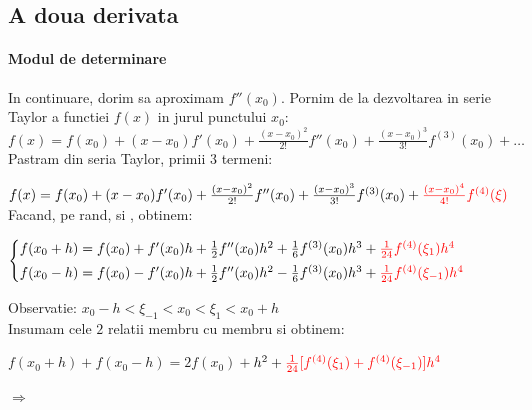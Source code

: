 \documentclass{article}
\begin{document}
\subsection{A doua derivata}
\label{sec:sec_der}

\paragraph{Modul de determinare}

\tabto{0.5cm} In continuare, dorim sa aproximam $f''(x_0)$. Pornim de la dezvoltarea in serie Taylor\framebox[0.3cm][r]{\footnotemark} a functiei $f(x)$ in jurul punctului $x_0$:
$f(x) = f(x_0) + (x-x_0)f'(x_0) + \frac{(x-x_0)^2}{2!}f''(x_0) + \frac{(x-x_0)^3}{3!}f^{(3)}(x_0) + \dots$\\

Pastram din seria Taylor, primii $3$ termeni:

$f(x) = f(x_0) + (x-x_0)f'(x_0) + \frac{(x-x_0)^2}{2!}f''(x_0) + \frac{(x-x_0)^3}{3!}f^{(3)}(x_0) + \textcolor{red}{\frac{(x-x_0)^4}{4!}f^{(4)}(\xi)}$\\

Facand, pe rand,  si , obtinem:

\vspace{0.1cm}$\begin{cases}
    f(x_0+h) = f(x_0) + f'(x_0) h + \frac{1}{2} f''(x_0) h^2 + \frac{1}{6} f^{(3)}(x_0) h^3 + \textcolor{red}{\frac{1}{24} f^{(4)}(\xi_1) h^4} \vspace{0.1cm}\\
    f(x_0-h) = f(x_0) - f'(x_0) h + \frac{1}{2} f''(x_0) h^2 - \frac{1}{6} f^{(3)}(x_0) h^3 + \textcolor{red}{\frac{1}{24} f^{(4)}(\xi_{-1}) h^4}
\end{cases}$

Observatie: $x_0-h < \xi_{-1} < x_0 < \xi_1 < x_0+h$ \\

Insumam cele $2$ relatii membru cu membru si obtinem:

$f(x_0+h) + f(x_0-h) = 2f(x_0) + $$ h^2 + \textcolor{red}{\frac{1}{24} [f^{(4)}(\xi_1) + f^{(4)}(\xi_{-1})] h^4}$

$\Longrightarrow$ 
\\
\end{document}

